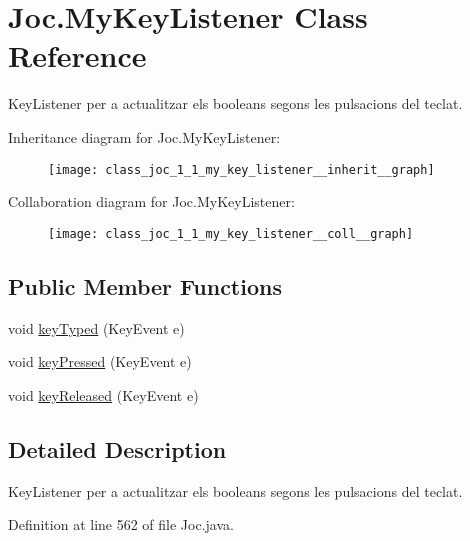\hypertarget{class_joc_1_1_my_key_listener}{}\section{Joc.\+My\+Key\+Listener Class Reference}
\label{class_joc_1_1_my_key_listener}


Key\+Listener per a actualitzar els booleans segons les pulsacions del teclat.  




Inheritance diagram for Joc.\+My\+Key\+Listener\+:\nopagebreak
\begin{figure}[H]
\begin{center}
\leavevmode
\texttt{[image: class\_joc\_1\_1\_my\_key\_listener\_\_inherit\_\_graph]}
\end{center}
\end{figure}


Collaboration diagram for Joc.\+My\+Key\+Listener\+:\nopagebreak
\begin{figure}[H]
\begin{center}
\leavevmode
\texttt{[image: class\_joc\_1\_1\_my\_key\_listener\_\_coll\_\_graph]}
\end{center}
\end{figure}
\subsection*{Public Member Functions}
\begin{DoxyCompactItemize}
\item 
void \hyperlink{class_joc_1_1_my_key_listener_a4ca06e4f3950c3745be88c484f12df85}{key\+Typed} (Key\+Event e)
\item 
void \hyperlink{class_joc_1_1_my_key_listener_a14addef50fc960bcd8e4ce5cc3d9c643}{key\+Pressed} (Key\+Event e)
\item 
void \hyperlink{class_joc_1_1_my_key_listener_af5f550e0c17018b1bce4648782aaa9fb}{key\+Released} (Key\+Event e)
\end{DoxyCompactItemize}


\subsection{Detailed Description}
Key\+Listener per a actualitzar els booleans segons les pulsacions del teclat. 

Definition at line 562 of file Joc.\+java.



